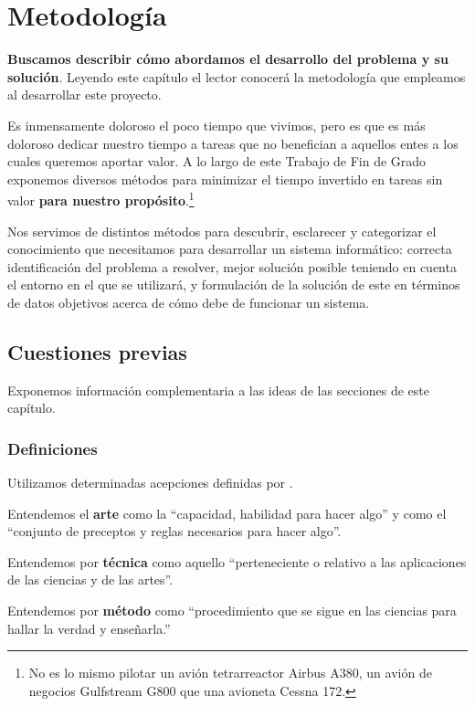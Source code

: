 \chapter{Metodología}

\textbf{Buscamos describir cómo abordamos el desarrollo del problema y su solución}.
Leyendo este capítulo el lector conocerá la metodología que empleamos al desarrollar este
proyecto.

Es inmensamente doloroso el poco tiempo que vivimos, pero es que es más doloroso dedicar
nuestro tiempo a tareas que no benefician a aquellos entes a los cuales queremos aportar
valor.
A lo largo de este Trabajo de Fin de Grado exponemos diversos métodos para minimizar
el tiempo invertido en tareas sin valor \textbf{para nuestro propósito}.\footnote{%
    No es lo mismo pilotar un avión tetrarreactor Airbus A380,
    un avión de negocios Gulfstream G800 que una avioneta Cessna 172.
}

Nos servimos de distintos métodos para descubrir, esclarecer y categorizar el conocimiento que necesitamos
para desarrollar un sistema informático: correcta identificación del problema a resolver,
mejor solución posible teniendo en cuenta el entorno en el que se utilizará,
y formulación de la solución de este en términos de datos objetivos acerca de cómo debe de
funcionar un sistema.

\section{Cuestiones previas}

Exponemos información complementaria a las ideas de las secciones de este capítulo.

\subsection{Definiciones}

Utilizamos determinadas acepciones definidas por \cite{RAE_DLE}.

Entendemos el \textbf{arte} como la ``capacidad, habilidad para hacer algo'' y como
el ``conjunto de preceptos y reglas necesarios para hacer algo''.

Entendemos por \textbf{técnica} como aquello ``perteneciente o relativo a las
aplicaciones de las ciencias y de las artes''.

Entendemos por \textbf{método} como ``procedimiento que se sigue en las ciencias
para hallar la verdad y enseñarla.''

